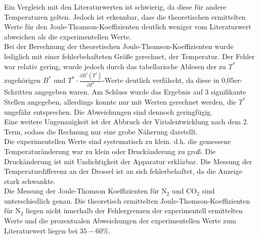 \documentclass[a4paper,12pt,oneside,onecolum,final,openany]{report}
\begin{document}
Ein Vergleich mit den Literaturwerten ist schwierig, da diese für andere Temperaturen gelten. Jedoch ist erkennbar, dass die theoretischen ermittelten Werte für den Joule-Thomson-Koeffizienten deutlich weniger vom Literaturwert abweichen als die experimentellen Werte.\\

Bei der Berechnung der theoretischen Joule-Thomson-Koeffizienten wurde lediglich mit einer fehlerbehafteten Größe gerechnet, der Temperatur. Der Fehler war relativ gering, wurde jedoch durch das tabellarische Ablesen der zu $T^*$ zugehörigen $B^*$ und $T^* \cdot \frac{\partial B^*(T^*)}{\partial T^*}$-Werte deutlich verfälscht, da diese in 0,05er- Schritten angegeben waren. Am Schluss wurde das Ergebnis auf 3 signifikante Stellen angegeben, allerdings konnte nur mit Werten gerechnet werden, die $T^*$ ungefähr entsprechen. Die Abweichungen sind dennoch geringfügig. \\
Eine weitere Ungenauigkeit ist der Abbruch der Virialentwicklung nach dem 2. Term, sodass die Rechnung nur eine grobe Näherung darstellt. \\

  
Die experimentellen Werte sind systematisch zu klein. d.h. die gemessene Temperaturänderung war zu klein oder Druckänderung zu groß. Die Druckänderung ist mit Undichtigkeit der Apparatur erklärbar. Die Messung der Temperaturdifferenz an der Drossel ist an sich fehlerbehaftet, da die Anzeige stark schwankte.\\

Die Messung der Joule-Thomson Koeffizienten für $\mathrm{N}_2$ und $\mathrm{CO}_2$ sind unterschiedlich genau.
Die theoretisch ermittelten Joule-Thomson-Koeffizienten für $\mathrm{N}_2$ liegen nicht innerhalb der Fehlergrenzen der experimentell ermittelten Werte und die prozentualen Abweichungen der experimentellen Werte zum Literaturwert liegen bei $35-60\%$.\\
\end{document}
